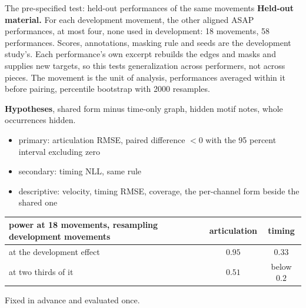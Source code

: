 \documentclass[aspectratio=169,11pt]{beamer}
\begin{document}
\begin{frame}{The pre-specified test: held-out performances of the same movements}
  \footnotesize
  \textbf{Held-out material.} For each development movement, the other
  aligned ASAP performances, at most four, none used in development: 18
  movements, 58 performances. Scores, annotations, masking rule and seeds
  are the development study's. Each performance's own excerpt rebuilds
  the edges and masks and supplies new targets, so this tests
  generalization across performers, not across pieces. The movement is
  the unit of analysis, performances averaged within it before pairing,
  percentile bootstrap with 2000 resamples.

  \textbf{Hypotheses}, shared form minus time-only graph, hidden motif
  notes, whole occurrences hidden.
  \begin{itemize}
    \item primary: articulation RMSE, paired difference $< 0$ with the
          95 percent interval excluding zero
    \item secondary: timing NLL, same rule
    \item descriptive: velocity, timing RMSE, coverage, the per-channel
          form beside the shared one
  \end{itemize}
  \begin{center}
  \setlength{\tabcolsep}{4pt}
  \begin{tabular}{@{}lcc@{}}
    \toprule
    power at 18 movements, resampling development movements & articulation & timing \\
    \midrule
    at the development effect & $0.95$ & $0.33$ \\
    at two thirds of it & $0.51$ & below $0.2$ \\
    \bottomrule
  \end{tabular}
  \end{center}
  Fixed in advance and evaluated once.
\end{frame}
\end{document}
